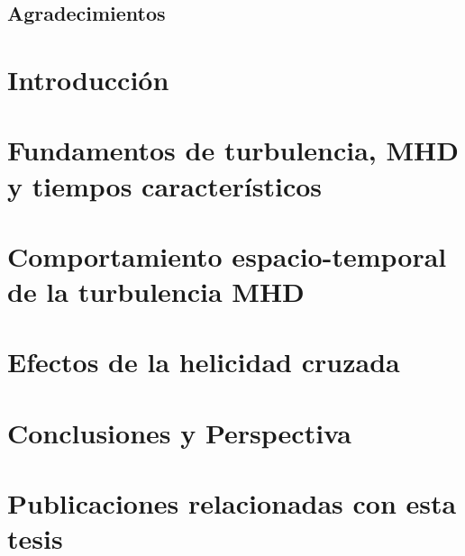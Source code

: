\documentclass[12pt]{book}
\begin{document}
\newpage

\section*{Agradecimientos}



\tableofcontents
\mainmatter
\chapter[Introducción]{Introducción}
\label{ch:introduccion}


\chapter[Fundamentos de turbulencia, MHD y tiempos característicos]{Fundamentos de turbulencia, MHD y tiempos característicos}
\label{ch:fundamentos}


\chapter[Comportamiento espacio-temporal de la turbulencia MHD]{Comportamiento espacio-temporal de la turbulencia MHD}
\label{ch:P1}


\chapter[Efectos de la helicidad cruzada]{Efectos de la helicidad cruzada}
\label{ch:P2}


\chapter[Conclusiones y Perspectiva]{Conclusiones y Perspectiva}
\label{ch:conclusiones}






\appendix

\chapter{Publicaciones relacionadas con esta tesis}
\label{ap:pub}






\end{document}
